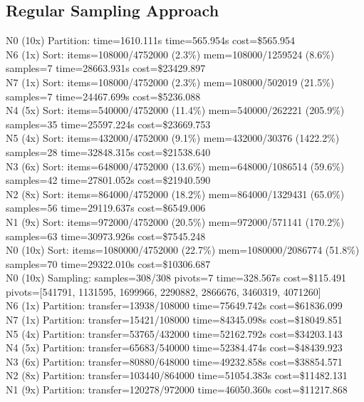 \documentclass[]{interact}
\theoremstyle{plain}
\theoremstyle{definition}
\theoremstyle{remark}
\begin{document}
\subsection{Regular Sampling Approach}
N0 (10x) Partition: time=1610.111\textmu s time=565.954\textmu s cost=\$565.954\\
N6 (1x) Sort: items=108000/4752000 (2.3\%) mem=108000/1259524 (8.6\%) samples=7 time=28663.931\textmu s cost=\$23429.897\\
N7 (1x) Sort: items=108000/4752000 (2.3\%) mem=108000/502019 (21.5\%) samples=7 time=24467.699\textmu s cost=\$5236.088\\
N4 (5x) Sort: items=540000/4752000 (11.4\%) mem=540000/262221 (205.9\%) samples=35 time=25597.224\textmu s cost=\$23669.753\\
N5 (4x) Sort: items=432000/4752000 (9.1\%) mem=432000/30376 (1422.2\%) samples=28 time=32848.315\textmu s cost=\$21538.640\\
N3 (6x) Sort: items=648000/4752000 (13.6\%) mem=648000/1086514 (59.6\%) samples=42 time=27801.052\textmu s cost=\$21940.590\\
N2 (8x) Sort: items=864000/4752000 (18.2\%) mem=864000/1329431 (65.0\%) samples=56 time=29119.637\textmu s cost=\$6549.006\\
N1 (9x) Sort: items=972000/4752000 (20.5\%) mem=972000/571141 (170.2\%) samples=63 time=30973.926\textmu s cost=\$7545.248\\
N0 (10x) Sort: items=1080000/4752000 (22.7\%) mem=1080000/2086774 (51.8\%) samples=70 time=29322.010\textmu s cost=\$10306.687\\
N0 (10x) Sampling: samples=308/308 pivots=7 time=328.567\textmu s cost=\$115.491 pivots=[541791, 1131595, 1699966, 2290882, 2866676, 3460319, 4071260]\\
N6 (1x) Partition: transfer=13938/108000 time=75649.742\textmu s cost=\$61836.099\\
N7 (1x) Partition: transfer=15421/108000 time=84345.098\textmu s cost=\$18049.851\\
N5 (4x) Partition: transfer=53765/432000 time=52162.792\textmu s cost=\$34203.143\\
N4 (5x) Partition: transfer=65683/540000 time=52384.474\textmu s cost=\$48439.923\\
N3 (6x) Partition: transfer=80880/648000 time=49232.858\textmu s cost=\$38854.571\\
N2 (8x) Partition: transfer=103440/864000 time=51054.383\textmu s cost=\$11482.131\\
N1 (9x) Partition: transfer=120278/972000 time=46050.360\textmu s cost=\$11217.868\\
\end{document}
